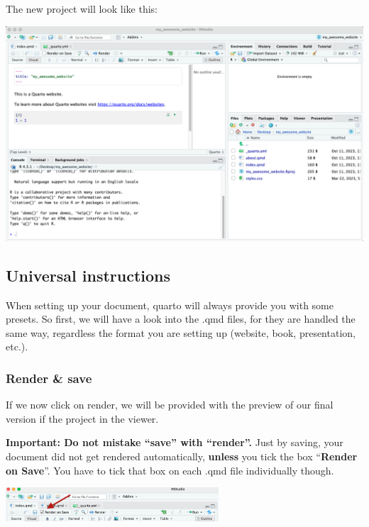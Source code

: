 \documentclass[
  letterpaper,
  DIV=11,
  numbers=noendperiod]{scrreprt}
\begin{document}
The new project will look like this:

\includegraphics{img/quarto_intro/Screenshot 2023-10-11 at 11.39.43.png}

\hypertarget{universal-instructions}{%
\subsection{Universal instructions}\label{universal-instructions}}

When setting up your document, quarto will always provide you with some
presets. So first, we will have a look into the .qmd files, for they are
handled the same way, regardless the format you are setting up (website,
book, presentation, etc.).

\hypertarget{render-save}{%
\subsubsection{Render \& save}\label{render-save}}

If we now click on render, we will be provided with the preview of our
final version if the project in the viewer.

\textbf{Important: Do not mistake ``save'' with ``render''.} Just by
saving, your document did not get rendered automatically,
\textbf{unless} you tick the box ``\textbf{Render on Save}''. You have
to tick that box on each .qmd file individually though.

\includegraphics[width=3.125in,height=\textheight]{img/quarto_intro/Screenshot 2023-10-11 at 14.12.45.png}
\end{document}

